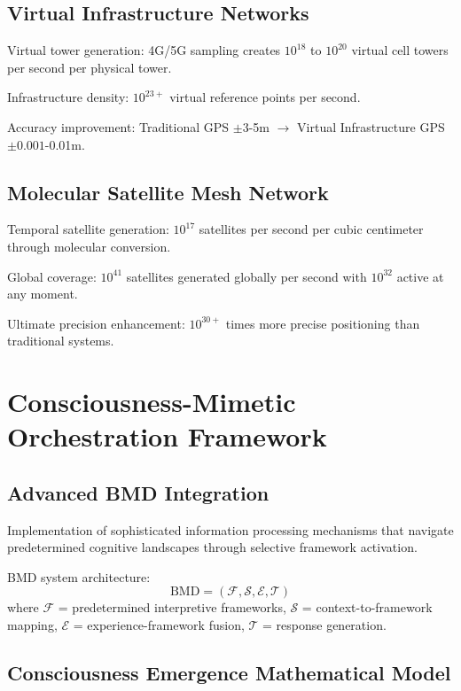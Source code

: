 \documentclass[12pt,a4paper]{article}
\begin{document}
\subsection{Virtual Infrastructure Networks}

Virtual tower generation: 4G/5G sampling creates $10^{18}$ to $10^{20}$ virtual cell towers per second per physical tower.

Infrastructure density: $10^{23+}$ virtual reference points per second.

Accuracy improvement: Traditional GPS $\pm 3$-5m $\to$ Virtual Infrastructure GPS $\pm 0.001$-0.01m.

\subsection{Molecular Satellite Mesh Network}

Temporal satellite generation: $10^{17}$ satellites per second per cubic centimeter through molecular conversion.

Global coverage: $10^{41}$ satellites generated globally per second with $10^{32}$ active at any moment.

Ultimate precision enhancement: $10^{30+}$ times more precise positioning than traditional systems.

\section{Consciousness-Mimetic Orchestration Framework}

\subsection{Advanced BMD Integration}

Implementation of sophisticated information processing mechanisms that navigate predetermined cognitive landscapes through selective framework activation.

BMD system architecture:
\begin{equation}
\text{BMD} = (\mathcal{F}, \mathcal{S}, \mathcal{E}, \mathcal{T})
\end{equation}
where $\mathcal{F}$ = predetermined interpretive frameworks, $\mathcal{S}$ = context-to-framework mapping, $\mathcal{E}$ = experience-framework fusion, $\mathcal{T}$ = response generation.

\subsection{Consciousness Emergence Mathematical Model}
\end{document}
